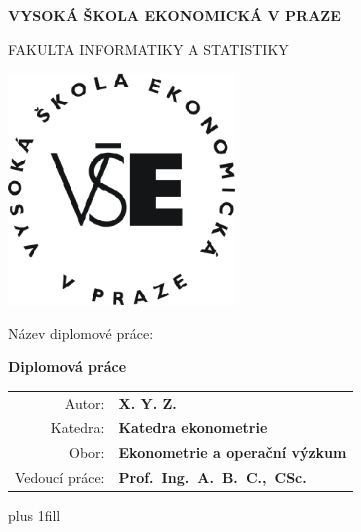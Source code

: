 \documentclass[12pt,a4paper]{report}
\begin{document}
\begin{center}

\large

{\bfseries VYSOKÁ ŠKOLA EKONOMICKÁ V PRAZE}

\medskip

FAKULTA INFORMATIKY A STATISTIKY

\vfill

\centerline{\mbox{\includegraphics[width=60mm]{vse.eps}}}

\vfill

{\Large Název diplomové práce:}

\vspace{2mm}

{\bf\LARGE Diplomová práce}

\vspace{15mm}



\vfill



\vfill

\begin{tabular}{rl}
Autor: & \bf X. Y. Z. \\
\noalign{\vspace{2mm}}
Katedra: & \bf Katedra ekonometrie \\
\noalign{\vspace{2mm}}
Obor: & \bf Ekonometrie a operační výzkum \\
\noalign{\vspace{2mm}}
Vedoucí práce: & \bf Prof.~Ing.~A.~B.~C.,~CSc. \\
\end{tabular}

\vfill



\end{center}
\newpage


\vglue 0pt plus 1fill
\end{document}
